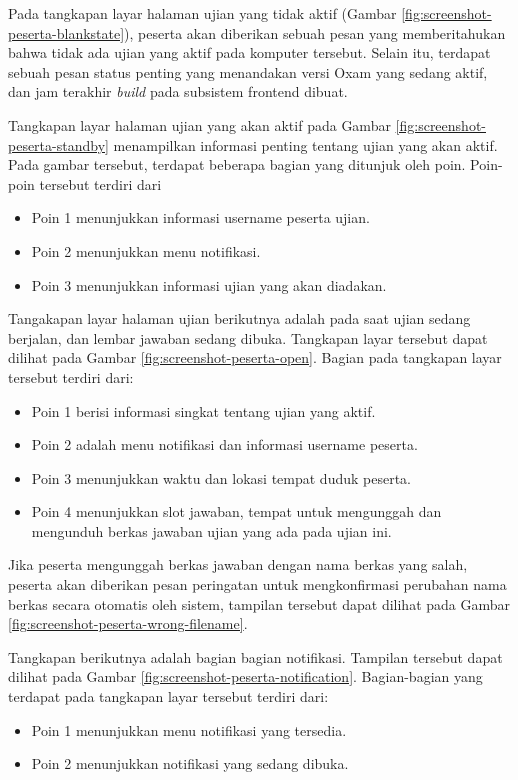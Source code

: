         Pada tangkapan layar halaman ujian yang tidak aktif (Gambar \ref{fig:screenshot-peserta-blankstate}), 
        peserta akan diberikan sebuah pesan
        yang memberitahukan bahwa tidak ada ujian yang aktif pada komputer tersebut. Selain itu, terdapat
        sebuah pesan status penting yang menandakan versi Oxam yang sedang aktif, dan jam terakhir
        \textit{build} pada subsistem frontend dibuat.
        
        Tangkapan layar halaman ujian yang akan aktif pada Gambar \ref{fig:screenshot-peserta-standby} menampilkan
        informasi penting tentang ujian yang akan aktif. Pada gambar tersebut, terdapat beberapa bagian yang ditunjuk
        oleh poin. Poin-poin tersebut terdiri dari
        \begin{itemize}
            \item Poin 1 menunjukkan informasi username peserta ujian.
            \item Poin 2 menunjukkan menu notifikasi.
            \item Poin 3 menunjukkan informasi ujian yang akan diadakan.
        \end{itemize}
        
        Tangakapan layar halaman ujian berikutnya adalah pada saat ujian sedang berjalan, dan lembar jawaban
        sedang dibuka. Tangkapan layar tersebut dapat dilihat pada Gambar \ref{fig:screenshot-peserta-open}.
        Bagian pada tangkapan layar tersebut terdiri dari:
        \begin{itemize}
            \item Poin 1 berisi informasi singkat tentang ujian yang aktif.
            \item Poin 2 adalah menu notifikasi dan informasi username peserta.
            \item Poin 3 menunjukkan waktu dan lokasi tempat duduk peserta.
            \item Poin 4 menunjukkan slot jawaban, tempat untuk mengunggah dan mengunduh berkas jawaban ujian
                yang ada pada ujian ini.
        \end{itemize}
        
        Jika peserta mengunggah berkas jawaban dengan nama berkas yang salah, peserta akan diberikan pesan peringatan untuk
        mengkonfirmasi perubahan nama berkas secara otomatis oleh sistem, tampilan tersebut dapat dilihat pada
        Gambar \ref{fig:screenshot-peserta-wrong-filename}.
        
        Tangkapan berikutnya adalah bagian bagian notifikasi. Tampilan tersebut dapat dilihat pada Gambar
        \ref{fig:screenshot-peserta-notification}. Bagian-bagian yang terdapat pada tangkapan layar tersebut
        terdiri dari:
        \begin{itemize}
            \item Poin 1 menunjukkan menu notifikasi yang tersedia.
            \item Poin 2 menunjukkan notifikasi yang sedang dibuka.
        \end{itemize}
        

